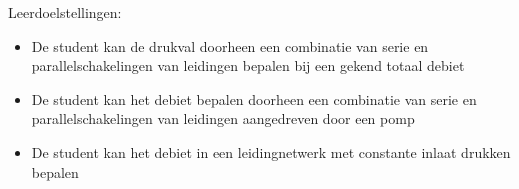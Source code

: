Leerdoelstellingen:
\begin{itemize}
	\item De student kan de drukval doorheen een combinatie van serie en parallelschakelingen van leidingen bepalen bij een gekend totaal debiet
	\item De student kan het debiet bepalen doorheen een combinatie van serie en parallelschakelingen van leidingen aangedreven door een pomp
	\item De student kan het debiet in een leidingnetwerk met constante inlaat drukken bepalen
\end{itemize}
